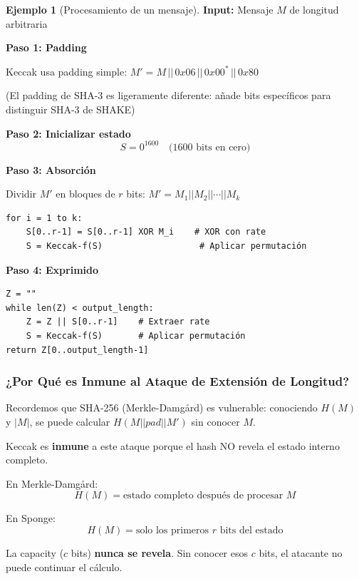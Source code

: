 \documentclass[11pt,a4paper,twoside,openright]{book}
\theoremstyle{definition}
\newtheorem{example}{Ejemplo}[chapter]
\theoremstyle{plain}
\theoremstyle{remark}
\begin{document}
\begin{example}[Procesamiento de un mensaje]
\textbf{Input:} Mensaje $M$ de longitud arbitraria

\textbf{Paso 1: Padding}

Keccak usa padding simple: $M' = M \,||\, 0x06 \,||\, 0x00^* \,||\, 0x80$

(El padding de SHA-3 es ligeramente diferente: añade bits específicos para distinguir SHA-3 de SHAKE)

\textbf{Paso 2: Inicializar estado}
\[ S = 0^{1600} \quad \text{(1600 bits en cero)} \]

\textbf{Paso 3: Absorción}

Dividir $M'$ en bloques de $r$ bits: $M' = M_1 || M_2 || \cdots || M_k$

\begin{verbatim}
for i = 1 to k:
    S[0..r-1] = S[0..r-1] XOR M_i    # XOR con rate
    S = Keccak-f(S)                   # Aplicar permutación
\end{verbatim}

\textbf{Paso 4: Exprimido}

\begin{verbatim}
Z = ""
while len(Z) < output_length:
    Z = Z || S[0..r-1]    # Extraer rate
    S = Keccak-f(S)       # Aplicar permutación
return Z[0..output_length-1]
\end{verbatim}
\end{example}

\subsubsection{¿Por Qué es Inmune al Ataque de Extensión de Longitud?}

\begin{advertencia}
Recordemos que SHA-256 (Merkle-Damgård) es vulnerable: conociendo $H(M)$ y $|M|$, se puede calcular $H(M || pad || M')$ sin conocer $M$.
\end{advertencia}

\begin{keyidea}
Keccak es \textbf{inmune} a este ataque porque el hash NO revela el estado interno completo.

En Merkle-Damgård:
\[ H(M) = \text{estado completo después de procesar } M \]

En Sponge:
\[ H(M) = \text{solo los primeros } r \text{ bits del estado} \]

La capacity ($c$ bits) \textbf{nunca se revela}. Sin conocer esos $c$ bits, el atacante no puede continuar el cálculo.
\end{keyidea}
\end{document}
